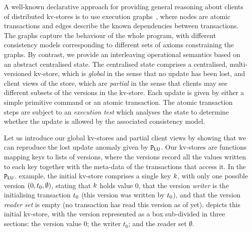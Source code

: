 


A well-known declarative approach for providing general reasoning
about clients of distributed kv-stores is to use  execution 
graphs~\cite{bothsorts}, where nodes are atomic transactions and edges describe the
known dependencies between transactions. The graphs capture the
behaviour of the whole program, with different consistency models
corresponding to different sets of axioms constraining the graphs. By
contrast, we provide an interleaving operational semantics based on an
abstract centralised state. The centralised state comprises a
centralised, multi-versioned kv-store, which is {\em global} in the
sense that no update has been lost, and client views of the store,
which are {\em partial} in the sense that clients may see different 
subsets of the versions in the kv-store. Each update is given by either
a simple primitive command or an atomic transaction. The atomic
transaction steps are subject to an {\em execution test} which
analyses the state to determine whether the update is allowed by 
the associated  consistency model. 



Let us introduce  our global kv-stores and partial client views by
showing that we can reproduce the lost update anomaly given by 
$\mathtt{P}_{\mathsf{LU}}$. 
Our kv-stores are functions mapping keys to lists of versions, where
the versions  record all the values written to each key together with the
meta-data of the transactions that access it. 
In the $\mathtt{P}_{\mathsf{LU}}$.  example, the initial kv-store comprises a single key $k$, with only one possible 
version $(0, t_{0}, \emptyset)$,  stating that $k$ holds value $0$, 
that the version \emph{writer} is the initialising transaction
$t_0$ (this version was written by $t_0$), 
and that the version \emph{reader set} is empty (no transaction has read this version as of yet). 
 depicts this initial kv-store, with the version
represented as a box sub-divided in three sections: the version value $0$;
the writer $t_0$; and the reader set $\emptyset$. 







